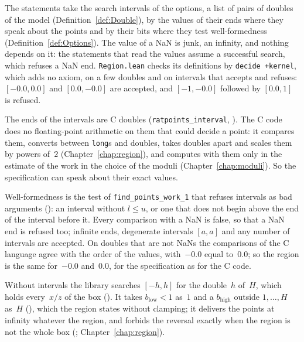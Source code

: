 The statements take the search intervals of the options, a list of pairs of doubles of the model
(Definition~\ref{def:Double}), by the values of their ends where they speak about the points and by
their bits where they test well-formedness (Definition~\ref{def:Options}). The value of a NaN is
junk, an infinity, and nothing depends on it: the statements that read the values assume a
successful search, which refuses a NaN end. \verb|Region.lean| checks its definitions by
\verb|decide +kernel|, which adds no axiom, on a few doubles and on intervals that \ratpoints{} accepts
and refuses: $[-0.0, 0.0]$ and $[0.0, -0.0]$ are accepted, and $[-1, -0.0]$ followed by $[0.0, 1]$
is refused.

\begin{remark}\label{rem:regionC}
  The ends of the intervals are C doubles (\verb|ratpoints_interval|,
  ). The C code does no floating-point arithmetic on them that could
  decide a point: it compares them, converts between \verb|long|s and doubles, takes doubles apart
  and scales them by powers of~$2$ (Chapter~\ref{chap:region}), and computes with them only in the
  estimate of the work in the choice of the moduli (Chapter~\ref{chap:moduli}). So the
  specification can speak about their exact values.

  Well-formedness is the test of \verb|find_points_work_1| that refuses intervals as bad arguments
  (): an interval without $l \le u$, or one that does not begin
  above the end of the interval before it. Every comparison with a NaN is false, so that a NaN end
  is refused too; infinite ends, degenerate intervals $[a, a]$ and any number of intervals are
  accepted. On doubles that are not NaNs the comparisons of the C language agree with the order of
  the values, with~$-0.0$ equal to~$0.0$; so the region is the same for~$-0.0$ and~$0.0$, for the
  specification as for the C code.

  Without intervals the library searches $[-h, h]$ for the double~$h$ of~$H$, which holds
  every~$x/z$ of the box (). It takes $b_{\mathrm{low}} < 1$
  as~$1$ and a $b_{\mathrm{high}}$ outside $1, \dots, H$ as~$H$
  (), which the region states without clamping; it delivers the
  points at infinity whatever the region, and forbids the reversal exactly when the region is not
  the whole box (; Chapter~\ref{chap:region}).
\end{remark}

